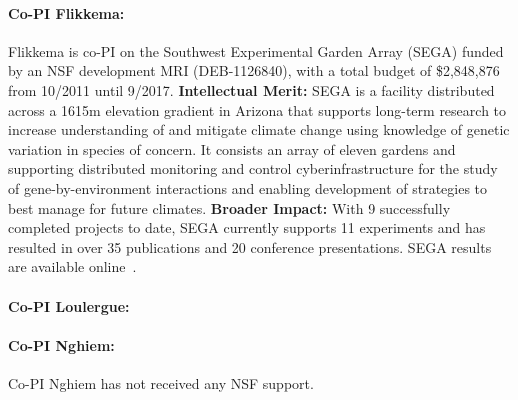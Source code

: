 \paragraph{Co-PI Flikkema:} Flikkema is co-PI on the Southwest Experimental Garden Array (SEGA)
funded by an NSF development MRI
(DEB-1126840), with a total budget of \$2,848,876 from 10/2011 until
9/2017. {\bf Intellectual Merit:} SEGA is a facility
distributed across a 1615m elevation gradient in Arizona that supports
long-term research to increase understanding of and mitigate climate
change using knowledge of genetic variation in species of concern. It
consists an array of eleven gardens and supporting distributed
monitoring and control cyberinfrastructure for the study of
gene-by-environment interactions and enabling development of
strategies to best manage for future climates. {\bf Broader
  Impact:}  With 9 successfully completed projects to date, SEGA
currently supports 11 experiments and has resulted in over 35
publications and 20 conference presentations.  SEGA results are
available online~\cite{SEGA}.

\paragraph{Co-PI Loulergue:}

\paragraph{Co-PI Nghiem:}
Co-PI Nghiem has not received any NSF support.